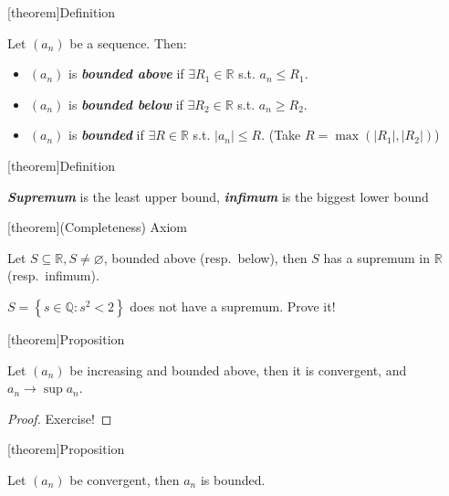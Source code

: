 \documentclass[12pt]{report}
\theoremstyle{definition}
\begin{document}
[theorem]{Definition}
\begin{bounded def}
    Let $(a_n)$ be a sequence. Then:
    \begin{itemize}
        \item $(a_n)$ is \textbf{\emph{bounded above}} if $\exists R_1 \in \mathbb{R}$ s.t. $a_n \le R_1$.

        \item $(a_n)$ is \textbf{\emph{bounded below}} if $\exists R_2 \in \mathbb{R}$ s.t. $a_n \ge R_2$.

        \item $(a_n)$ is \textbf{\emph{bounded}} if $\exists R \in \mathbb{R}$ s.t. $|a_n| \le R$.
            (Take $R = \max{(|R_1|, |R_2|)}$)
    \end{itemize}
\end{bounded def}

[theorem]{Definition}
\begin{infimum and supremum}
    \textbf{\emph{Supremum}} is the least upper bound, \textbf{\emph{infimum}} is the biggest lower bound
\end{infimum and supremum}

[theorem]{(Completeness) Axiom}
\begin{Completeness axiom}
    Let $S \subseteq \mathbb{R}, S \neq \varnothing$, bounded above (resp.\ below),
    then $S$ has a supremum in $\mathbb{R}$ (resp.\ infimum).
\end{Completeness axiom}

\begin{ex}
    $S = \left\{s \in \mathbb{Q} : s^{2} < 2\right\} $ does not have a supremum. Prove it!
\end{ex}

[theorem]{Proposition}
\begin{increasing and bounded above}
    Let $(a_n)$ be increasing and bounded above, then it is convergent,
    and $a_n \rightarrow{} \sup{a_n}$.
\end{increasing and bounded above}

\begin{proof}
    Exercise!
\end{proof}

[theorem]{Proposition}
\begin{convergent series is bounded}
    Let $(a_n)$ be convergent, then $a_n$ is bounded.
\end{convergent series is bounded}
\end{document}
